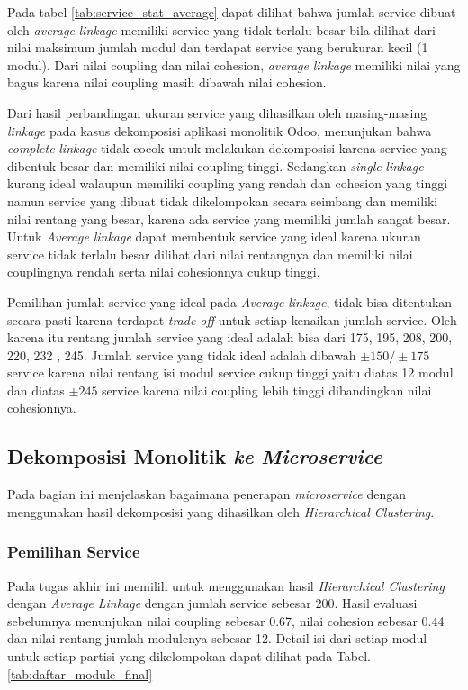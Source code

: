 Pada tabel \ref{tab:service_stat_average} dapat dilihat bahwa jumlah service dibuat oleh \textit{average} \textit{linkage} memiliki service yang tidak terlalu besar bila dilihat dari nilai maksimum jumlah modul dan terdapat service yang berukuran kecil (1 modul). Dari nilai coupling dan nilai cohesion, \textit{average} \textit{linkage} memiliki nilai yang bagus karena nilai coupling masih dibawah nilai cohesion. 

Dari hasil perbandingan ukuran service yang dihasilkan oleh masing-masing \textit{linkage} pada kasus dekomposisi aplikasi monolitik Odoo, menunjukan bahwa \textit{complete} \textit{linkage} tidak cocok untuk melakukan dekomposisi karena service yang dibentuk besar dan memiliki nilai coupling tinggi. Sedangkan \textit{single} \textit{linkage} kurang ideal walaupun memiliki coupling yang rendah dan cohesion yang tinggi namun service yang dibuat tidak dikelompokan secara seimbang dan memiliki nilai rentang yang besar, karena ada service yang memiliki jumlah sangat besar. Untuk \textit{Average} \textit{linkage} dapat membentuk service yang ideal karena ukuran service tidak terlalu besar dilihat dari nilai rentangnya dan memiliki nilai couplingnya rendah serta nilai cohesionnya cukup tinggi. 

Pemilihan jumlah service yang ideal pada \textit{Average} \textit{linkage}, tidak bisa ditentukan secara pasti karena terdapat \textit{trade-off} untuk setiap kenaikan jumlah service. Oleh karena itu rentang jumlah service yang ideal adalah bisa dari 175, 195, 208, 200, 220, 232 , 245. Jumlah service yang tidak ideal adalah dibawah $\pm 150 / \pm 175$ service karena nilai rentang isi modul service cukup tinggi yaitu diatas 12 modul dan diatas $\pm 245$ service karena nilai coupling lebih tinggi dibandingkan nilai cohesionnya. \\

\pagebreak

\subsection{Dekomposisi Monolitik \textit{ ke \textit{Microservice}}}
Pada bagian ini menjelaskan bagaimana penerapan \textit{microservice} dengan menggunakan hasil dekomposisi yang dihasilkan oleh \textit{Hierarchical Clustering}. 

\subsubsection{Pemilihan Service}
Pada tugas akhir ini memilih untuk menggunakan hasil \textit{Hierarchical Clustering} dengan \textit{Average} \textit{Linkage} dengan jumlah service sebesar 200. Hasil evaluasi sebelumnya menunjukan nilai coupling sebesar 0.67, nilai cohesion sebesar 0.44 dan nilai rentang jumlah modulenya sebesar 12. Detail isi dari setiap modul untuk setiap partisi yang dikelompokan dapat dilihat pada Tabel. \ref{tab:daftar_module_final} 

